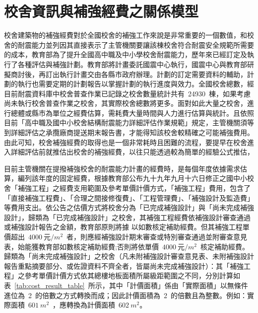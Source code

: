 \renewcommand\thetable{\arabic{chapter}-\arabic{table}}
\chapter{校舍資訊與補強經費之關係模型}

校舍建築物的補強經費對於全國校舍的補強工作來說是非常重要的一個數值，和校舍的耐震能力並列因其直接表示了主管機關要讓該棟校舍符合耐震安全規範所需要的成本，教育部為了提升全國高中職及中小學校舍耐震能力，歷年來已經訂定及執行了各種評估與補強計劃。教育部將計畫委託國震中心執行，國震中心與教育部研擬商討後，再訂出執行計畫交由各縣市政府辦理。計劃的訂定需要資料的輔助，計劃的執行也需要定期的計劃報告以掌握計劃的執行進度與效力。全國校舍總數，經目前耐震資料庫中校舍普查作業已記錄之校舍數量統計共有~24930~棟，如果考慮尚未執行校舍普查作業之校舍，其實際校舍總數將更多。面對如此大量之校舍，進行總體或縣市為單位之經費估算，需耗費大量時間與人力進行估算與統計。且依照目前「高中職及國中小校舍結構耐震能力詳細評估作業規範」規定，主管機關須等到詳細評估之承攬廠商提送期末報告書，才能得知該校舍較精確之可能補強費用。由此可知，校舍補強經費的取得也是一個非常耗時且困難的流程，要提早在校舍進入詳細評估前就推估出校舍的補強經費，以往只能透過較為簡單的經驗公式推估，

目前主管機關在提撥補強校舍的耐震能力計畫的經費時，是每個年度依據需求估算，編列該年度的固定經費，根據教育部公布九十九年九月十六日修正之國中小校舍「補強工程」之經費支用範圍及參考單價計價方式，「補強工程」費用，包含了「直接補強工程費」、「合理之間接修復費」、「工程管理費」、「補強設計及監造費」等費用支出。依公告之估價方式將校舍分為「已完成補強設計」與「尚未完成補強設計」，歸類為「已完成補強設計」之校舍，其補強工程經費依補強設計審查通過或補強設計報告之金額，教育部原則將據 以如數核定補助經費。但其補強工程單價超出~$4000~\text{元}/m^2$~者，則應經補強設計期末審查或特別審查通過並附審查意見表，始能獲教育部如數核定補助經費;否則將依單價~$4000~\text{元}/m^2$~核定補助經費。歸類為「尚未完成補強設計」之校舍（凡未附補強設計審查意見表、未附補強設計報告重點摘要部分、或佐證資料不齊全者，皆屬尚未完成補強設計）：其「補強工程」之參考單價計價方式依其總樓地板面積所屬級距範圍之不同，分別計算如表~\ref{tab:cost_result_table}~所示，其中「計價面積」係由「實際面積」以無條件進位為~2~的倍數之方式轉換而成；因此計價面積為~2~的倍數且為整數。例如：實際面積~$601~m^2$~，應轉換為計價面積~$602~m^2$。


